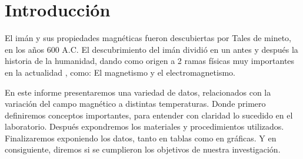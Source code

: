 \section{Introducción}
El imán y sus propiedades magnéticas fueron descubiertas por Tales de mineto, en los años 600 A.C.
El descubrimiento del imán dividió en un antes y después la historia de la humanidad, dando como origen a 2 ramas físicas muy importantes en la actualidad , como: El magnetismo y el electromagnetismo.

En este informe presentaremos una variedad de datos, relacionados con la variación del campo magnético a distintas temperaturas.
Donde primero definiremos conceptos importantes, para entender con claridad lo sucedido en el laboratorio. Después expondremos los materiales y procedimientos utilizados. 
Finalizaremos exponiendo los datos, tanto en tablas como en gráficas. Y en consiguiente, diremos si se cumplieron los objetivos de nuestra investigación.